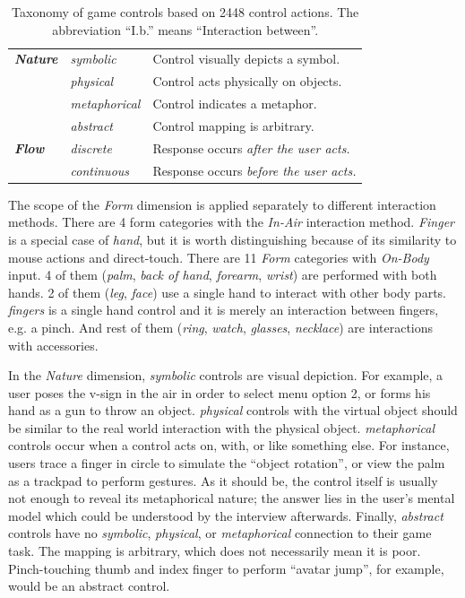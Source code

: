 \documentclass{sigchi}
\begin{document}
\begin{table}
\begin{adjustwidth}{-0.4cm}{}
\begin{tabular}{|l|l|l|}
        \textbf{\em{Nature}} & \em{symbolic} & Control visually depicts a symbol.\\ \cline{2-3} 
             & \em{physical} & Control acts physically on objects.\\ \cline{2-3} 
             & \em{metaphorical} & Control indicates a metaphor.\\ \cline{2-3} 
             & \em{abstract} & Control mapping is arbitrary.\\
      \Xhline{4\arrayrulewidth}
        \textbf{\em{Flow}} & \em{discrete} & Response occurs \em{after} the user acts.\\ \cline{2-3} 
             & \em{continuous} & Response occurs \em{before} the user acts.\\
      \hline
    \end{tabular}
    \caption{Taxonomy of game controls based on 2448 control actions. The abbreviation ``I.b.'' means ``Interaction between''.}
    \label{tab:taxonomy}
    \end{adjustwidth}
  \end{table}

  The scope of the \emph{Form} dimension is applied separately to different interaction methods. There are 4 form categories with the \emph{In-Air} interaction method. \emph{Finger} is a special case of \emph{hand}, but it is worth distinguishing because of its similarity to mouse actions and direct-touch. There are 11 \emph{Form} categories with \emph{On-Body} input. 4 of them (\emph{palm}, \emph{back of hand}, \emph{forearm}, \emph{wrist}) are performed with both hands. 2 of them (\emph{leg}, \emph{face}) use a single hand to interact with other body parts. \emph{fingers} is a single hand control and it is merely an interaction between fingers, e.g. a pinch. And rest of them (\emph{ring}, \emph{watch}, \emph{glasses}, \emph{necklace}) are interactions with accessories.


  In the \emph{Nature} dimension, \emph{symbolic} controls are visual depiction. For example, a user poses the v-sign in the air in order to select menu option 2, or forms his hand as a gun to throw an object. \emph{physical} controls with the virtual object should be similar to the real world interaction with the physical object. \emph{metaphorical} controls occur when a control acts on, with, or like something else. For instance, users trace a finger in circle to simulate the ``object rotation'', or view the palm as a trackpad to perform gestures. As it should be, the control itself is usually not enough to reveal its metaphorical nature; the answer lies in the user's mental model which could be understood by the interview afterwards. Finally, \emph{abstract} controls have no \emph{symbolic}, \emph{physical}, or \emph{metaphorical} connection to their game task. The mapping is arbitrary, which does not necessarily mean it is poor. Pinch-touching thumb and index finger to perform ``avatar jump'', for example, would be an abstract control.
\end{document}
